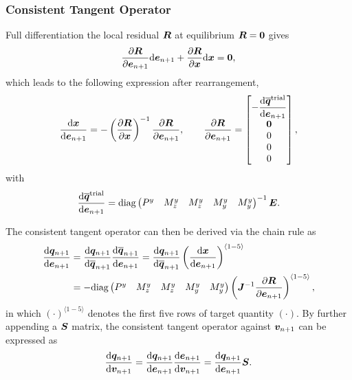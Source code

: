 \subsubsection{Consistent Tangent Operator}
Full differentiation the local residual $\bm{R}$ at equilibrium $\bm{R}=\bm{0}$ gives
\begin{gather}
\dfrac{\partial{\bm{R}}}{\partial{\bm{e}_{n+1}}}\mathrm{d}\bm{e}_{n+1}+\dfrac{\partial{\bm{R}}}{\partial{\bm{x}}}\mathrm{d}\bm{x}=\bm{0},
\end{gather}
which leads to the following expression after rearrangement,
\begin{gather}
\dfrac{\mathrm{d}\bm{x}}{\mathrm{d}\bm{e}_{n+1}}=-\left(\dfrac{\partial{\bm{R}}}{\partial{\bm{x}}}\right)^{-1}\dfrac{\partial{\bm{R}}}{\partial{\bm{e}_{n+1}}},\qquad
\dfrac{\partial{\bm{R}}}{\partial{\bm{e}_{n+1}}}=\begin{bmatrix}
-\dfrac{\mathrm{d}\bm{\overline{q}}^\text{trial}}{\mathrm{d}\bm{e}_{n+1}}\\\bm{0}\\0\\0\\0
\end{bmatrix},
\end{gather}
with
\begin{gather}
\dfrac{\mathrm{d}\bm{\overline{q}}^\text{trial}}{\mathrm{d}\bm{e}_{n+1}}=\text{diag}\left(\begin{matrix}
P^y&M^y_z&M^y_z&M^y_y&M^y_y
\end{matrix}\right)^{-1}\bm{E}.
\end{gather}

The consistent tangent operator can then be derived via the chain rule as
\begin{gather}\label{eq:nm_consistent_tangent}
\begin{split}
\dfrac{\mathrm{d}\bm{q}_{n+1}}{\mathrm{d}\bm{e}_{n+1}}&=\dfrac{\mathrm{d}\bm{q}_{n+1}}{\mathrm{d}\bm{\overline{q}}_{n+1}}\dfrac{\mathrm{d}\bm{\overline{q}}_{n+1}}{\mathrm{d}\bm{e}_{n+1}}=\dfrac{\mathrm{d}\bm{q}_{n+1}}{\mathrm{d}\bm{\overline{q}}_{n+1}}\left(\dfrac{\mathrm{d}\bm{x}}{\mathrm{d}\bm{e}_{n+1}}\right)^{\langle1-5\rangle}\\
&=-\text{diag}\left(\begin{matrix}
P^y&M^y_z&M^y_z&M^y_y&M^y_y
\end{matrix}\right)\left(\bm{J}^{-1}\dfrac{\partial{\bm{R}}}{\partial{\bm{e}_{n+1}}}\right)^{\langle1-5\rangle},
\end{split}
\end{gather}
in which $\left(\cdot\right)^{\langle1-5\rangle}$ denotes the first five rows of target quantity $\left(\cdot\right)$. By further appending a $\bm{S}$ matrix, the consistent tangent operator against $\bm{v}_{n+1}$ can be expressed as
\begin{gather}
\dfrac{\mathrm{d}\bm{q}_{n+1}}{\mathrm{d}\bm{v}_{n+1}}=\dfrac{\mathrm{d}\bm{q}_{n+1}}{\mathrm{d}\bm{e}_{n+1}}\dfrac{\mathrm{d}\bm{e}_{n+1}}{\mathrm{d}\bm{v}_{n+1}}=\dfrac{\mathrm{d}\bm{q}_{n+1}}{\mathrm{d}\bm{e}_{n+1}}\bm{S}.
\end{gather}
